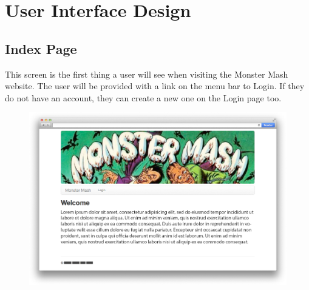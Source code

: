 \section{User Interface Design}
\subsection{Index Page}
This screen is the first thing a user will see when visiting the Monster Mash website. The user will be provided with a link on the menu bar to Login. If they do not have an account, they can create a new one on the Login page too.
\begin{figure}[h]
\centering
\includegraphics[width=1.00\textwidth]{index.png}
\label{fig:index}
\end{figure}

